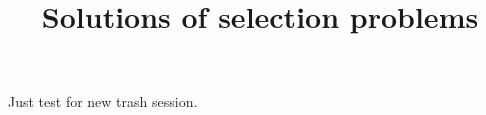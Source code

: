 \documentclass[12pt,a4paper]{article}
\title{Solutions of selection problems}
\begin{document}
\fontsize{12pt}{20pt}\selectfont

Just test for new trash session.
        
\end{document}

